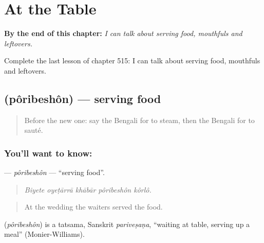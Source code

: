 
\chapter{At the Table}
\label{ch:bn-at-the-table}

\begin{chapteropening}
\textbf{By the end of this chapter:} \emph{I can talk about serving food, mouthfuls and leftovers.}

Complete the last lesson of chapter 515: I can talk about serving food, mouthfuls and leftovers.
\end{chapteropening}

\section[\texorpdfstring{\bn{পরিবেশন} (pôribeshôn)}{পরিবেশন (pôribeshôn)}]{ (pôribeshôn) — serving food}

\label{lesson:BN-C515-poribeshon}



\begin{quote}
Before the new one: say the Bengali for to steam, then the Bengali for to sauté.
\end{quote}

\subsection*{You'll want to know: }
\textbf{} — \emph{pôribeshôn} — \textquotedblleft{}serving food\textquotedblright{}.

\begin{quote}
    
\end{quote}

\begin{quote}
\emph{Biyete oyeṭārrā khābār pôribeshôn kôrlô.}
\end{quote}

\begin{quote}
At the wedding the waiters served the food.
\end{quote}

\begin{cousinweb}
\textbf{} (\emph{pôribeshôn}) is a tatsama, Sanskrit \emph{pariveṣaṇa}, \textquotedblleft{}waiting at table, serving up a meal\textquotedblright{} (Monier-Williams).
\end{cousinweb}

